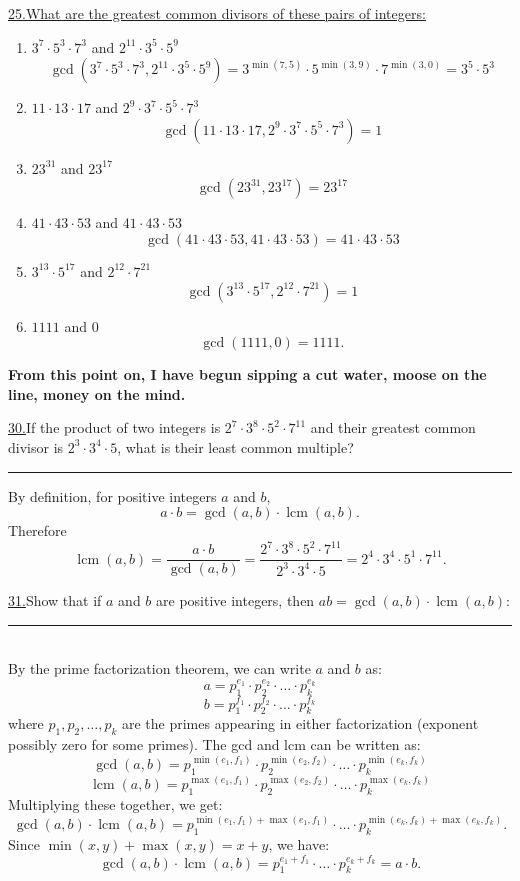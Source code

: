 \documentclass[12pt]{article}
\DeclareMathOperator{\lcm}{lcm}
\begin{document}
\vspace{5mm}
\noindent\underline{25.\;What are the greatest common divisors of these pairs of integers:}
\begin{enumerate}[label=(\alph*)]
    \item $3^7 \cdot 5^3 \cdot 7^3$ and $2^{11} \cdot 3^5 \cdot 5^9$
\[
\gcd(3^7 \cdot 5^3 \cdot 7^3, 2^{11} \cdot 3^5 \cdot 5^9) = 3^{\min(7,5)} \cdot 5^{\min(3,9)} \cdot 7^{\min(3,0)} = 3^5 \cdot 5^3
\]
    \item $11 \cdot 13 \cdot 17$ and $2^9 \cdot 3^7 \cdot 5^5 \cdot 7^3$
\[
\gcd(11 \cdot 13 \cdot 17, 2^9 \cdot 3^7 \cdot 5^5 \cdot 7^3) = 1
\]
    \item $23^{31}$ and $23^{17}$
\[
\gcd(23^{31}, 23^{17}) = 23^{17}
\]
    \item $41 \cdot 43 \cdot 53$ and $41 \cdot 43 \cdot 53$
\[
\gcd(41 \cdot 43 \cdot 53, 41 \cdot 43 \cdot 53) = 41 \cdot 43 \cdot 53
\]
    \item $3^{13} \cdot 5^{17}$ and $2^{12} \cdot 7^{21}$
\[
\gcd(3^{13} \cdot 5^{17}, 2^{12} \cdot 7^{21}) = 1
\]
    \item $1111$ and $0$
\[
\gcd(1111, 0) = 1111.
\]
\end{enumerate}

\vspace{15mm}
\textbf{From this point on, I have begun sipping a cut water, moose on the line, money on the mind.}


\noindent\underline{30.}If the product of two integers is $2^7\cdot 3^8 \cdot 5^2 \cdot 7^{11}$ and their greatest common divisor is $2^3 \cdot 3^4 \cdot 5$, what is their least common multiple?
 \\ \rule{\linewidth}{0.5pt}
By definition, for positive integers $a$ and $b$,
\[
a \cdot b = \gcd(a,b) \cdot \lcm(a,b).
\]
Therefore
\[
\lcm(a,b) = \frac{a \cdot b}{\gcd(a,b)} = \frac{2^7\cdot 3^8 \cdot 5^2 \cdot 7^{11}}{2^3 \cdot 3^4 \cdot 5} = 2^{4} \cdot 3^{4} \cdot 5^{1} \cdot 7^{11}.
\]

\vspace{5mm}

\noindent\underline{31.}Show that if $a$ and $b$ are positive integers, then $ab=\gcd(a,b) \cdot \lcm(a,b)$:
\\ \rule{\linewidth}{0.5pt}
\\\indent By the prime factorization theorem, we can write $a$ and $b$ as:
\[a = p_1^{e_1} \cdot p_2^{e_2} \cdot \dots \cdot p_k^{e_k}\]
\[b = p_1^{f_1} \cdot p_2^{f_2} \cdot \dots \cdot p_k^{f_k}\]
where $p_1, p_2, \dots, p_k$ are the primes appearing in either factorization (exponent possibly zero for some primes).
The gcd and lcm can be written as:
\[\gcd(a,b) = p_1^{\min(e_1,f_1)} \cdot p_2^{\min(e_2,f_2)} \cdot \dots \cdot p_k^{\min(e_k,f_k)}\]
\[\lcm(a,b) = p_1^{\max(e_1,f_1)} \cdot p_2^{\max(e_2,f_2)} \cdot \dots \cdot p_k^{\max(e_k,f_k)}\]
Multiplying these together, we get:
\[
 \gcd(a,b) \cdot \lcm(a,b) = p_1^{\min(e_1,f_1) + \max(e_1,f_1)} \cdot \dots \cdot p_k^{\min(e_k,f_k) + \max(e_k,f_k)}.
\]
Since $\min(x,y) + \max(x,y) = x + y$, we have:
\[
 \gcd(a,b) \cdot \lcm(a,b) = p_1^{e_1 + f_1} \cdot \dots \cdot p_k^{e_k + f_k} = a \cdot b.
\]
\end{document}
